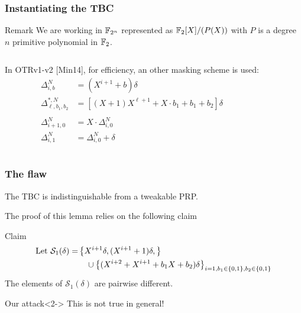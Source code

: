 \documentclass{beamer}
\begin{document}
	\begin{frame}
		\frametitle{Instantiating the TBC}

		\begin{alertblock}{Remark}
			We are working in $\F_{2^n}$ represented as $\F_2[X]/(P(X))$ with $P$ is a degree $n$ primitive polynomial in $\F_2$.
		\end{alertblock}

		\begin{columns}
		 
			In OTRv1-v2 {[Min14]}, for efficiency, an other masking scheme is used:
			\begin{align*}
				\Delta^{N}_{i,b} &= (X^{i+1} + b) \delta \\
				\Delta^{*,N}_{\ell,b_1,b_2} &= [(X+1)X^{\ell+1} + X\cdot b_1 +b_1 +b_2]\delta \\
				&\\
				\Delta^N_{i+1,0} &= X \cdot \Delta^N_{i,0} \\
				\Delta^N_{i,1} &= \Delta^N_{i,0} + \delta
			\end{align*}

				\begin{tikzpicture}[
					scale=1,
					node distance=1.8cm,
					line width = 0.5pt,
					]
					
				\end{tikzpicture}
			\end{columns}
	\end{frame}

	\begin{frame}
		\frametitle{The flaw}

		\begin{lemma}[{Lemma 1 of [Min14]}]
			The TBC is indistinguishable from a tweakable PRP.
		\end{lemma}
		The proof of this lemma relies on the following claim
		\begin{block}{Claim}
		\begin{align*}
		\mbox{Let }\mathcal{S}_1(\delta) = & \left\{X^{i+1}\delta, (X^{i+1} +1)\delta,\right\} \\
		 &\tab \cup \left\{ (X^{i+2} + X^{i+1} + b_1 X + b_2)\delta \right\}_{i=1, b_1 \in \zeon, b_2 \in \zeon} 
		\end{align*}
		The elements of $\mathcal{S}_1(\delta)$
		are pairwise different.
		\end{block}
	
		\begin{alertblock}{Our attack}<2->
			This is not true in general!
		\end{alertblock}

	\end{frame}
\end{document}
